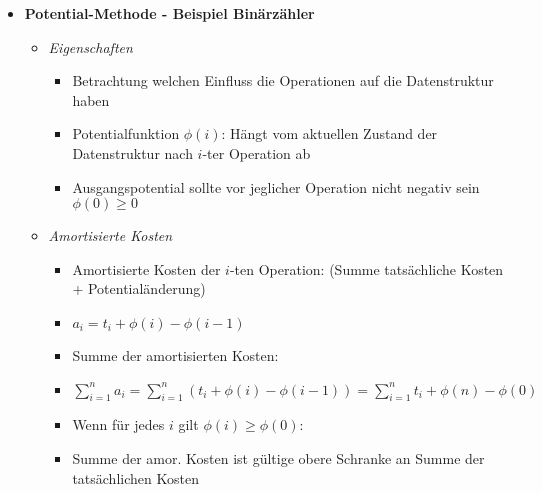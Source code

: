 \begin{itemize}
        \item \textbf{Potential-Methode - Beispiel Binärzähler}
            \begin{itemize}
                \item \textit{Eigenschaften}
                    \begin{itemize}
                        \item Betrachtung welchen Einfluss die Operationen auf die Datenstruktur haben
                        \item Potentialfunktion $\phi(i)$: Hängt vom aktuellen Zustand der Datenstruktur nach $i$-ter Operation ab
                        \item Ausgangspotential sollte vor jeglicher Operation nicht negativ sein $\phi(0) \geq 0$
                    \end{itemize}

                \item \textit{Amortisierte Kosten}
                    \begin{itemize}
                        \item Amortisierte Kosten der $i$-ten Operation: (Summe tatsächliche Kosten + Potentialänderung)
                        \item[] $a_i = t_i + \phi(i) - \phi(i-1)$
                        \item Summe der amortisierten Kosten:
                        \item[] $\sum^n_{i=1} a_i = \sum^n_{i=1} (t_i + \phi(i) - \phi(i - 1)) = \sum^n_{i=1} t_i + \phi(n) - \phi(0)$
                        \item Wenn für jedes $i$ gilt $\phi(i) \geq \phi(0)$:
                        \item[] Summe der amor. Kosten ist gültige obere Schranke an Summe der tatsächlichen Kosten 
                    \end{itemize}


\end{itemize}
\end{itemize}
